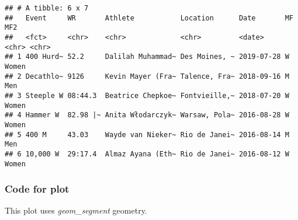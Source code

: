 \documentclass[]{book}
\begin{document}
\begin{verbatim}
## # A tibble: 6 x 7
##   Event     WR       Athlete           Location      Date       MF    MF2  
##   <fct>     <chr>    <chr>             <chr>         <date>     <chr> <chr>
## 1 400 Hurd~ 52.2     Dalilah Muhammad~ Des Moines, ~ 2019-07-28 W     Women
## 2 Decathlo~ 9126     Kevin Mayer (Fra~ Talence, Fra~ 2018-09-16 M     Men  
## 3 Steeple W 08:44.3  Beatrice Chepkoe~ Fontvieille,~ 2018-07-20 W     Women
## 4 Hammer W  82.98 |~ Anita Włodarczyk~ Warsaw, Pola~ 2016-08-28 W     Women
## 5 400 M     43.03    Wayde van Nieker~ Rio de Janei~ 2016-08-14 M     Men  
## 6 10,000 W  29:17.4  Almaz Ayana (Eth~ Rio de Janei~ 2016-08-12 W     Women
\end{verbatim}

\hypertarget{tfwrcode}{%
\subsubsection*{Code for plot}\label{tfwrcode}}

This plot uses \emph{geom\_segment} geometry.
\end{document}
